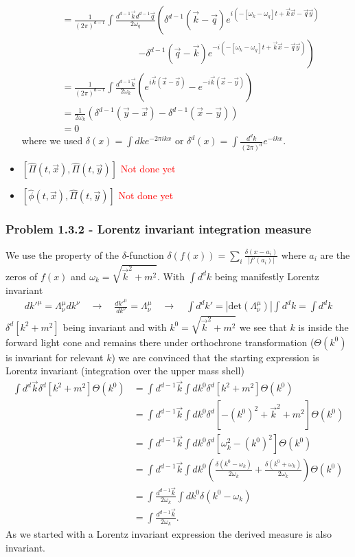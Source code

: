 \documentclass[10pt,a4paper]{article}
\theoremstyle{definition}
\begin{document}
\begin{itemize}
\begin{align}
    &= \frac{1}{(2\pi)^{d-1}}\int \frac{d^{d-1}\vec{k}d^{d-1}\vec{q}}{2 \omega_q}\left(\delta^{d-1}(\vec{k}-\vec{q})e^{i(-[\omega_k-\omega_q]t+\vec{k}\vec{x}-\vec{q}\vec{y})}\right.\\
    &\qquad\qquad\qquad\qquad\left.-\delta^{d-1}(\vec{q}-\vec{k})e^{-i(-[\omega_k-\omega_q]t+\vec{k}\vec{x}-\vec{q}\vec{y})}\right)\\
    &= \frac{1}{(2\pi)^{d-1}}\int \frac{d^{d-1}\vec{k}}{2 \omega_k}\left(e^{i\vec{k}(\vec{x}-\vec{y})}-e^{-i\vec{k}(\vec{x}-\vec{y})}\right)\\
    &= \frac{1}{2 \omega_k}\left( \delta^{d-1}(\vec{y}-\vec{x})-\delta^{d-1}(\vec{x}-\vec{y})\right)\\
    &=0
\end{align}
where we used $\delta(x)=\int dk e^{-2\pi i kx}$ or $\delta^d(x)=\int \frac{d^dk}{(2\pi)^d} e^{-ikx}$.

\item $[\hat\Pi(t,\vec{x}),\hat\Pi(t,\vec{y})]$
\textcolor{red}{Not done yet}
\item $[\hat\phi(t,\vec{x}),\hat\Pi(t,\vec{y})]$
\textcolor{red}{Not done yet}
\end{itemize}

\subsubsection{Problem 1.3.2 - Lorentz invariant integration measure}
We use the property of the $\delta$-function $\delta(f(x))=\sum_i\frac{\delta(x-a_i)}{]f'(a_i)|}$ where ${a_i}$ are the zeros of $f(x)$ and $\omega_k=\sqrt{\vec{k}^2+m^2}$. With $\int d^dk$ being manifestly Lorentz invariant 
\begin{align}
    dk'^\mu = \Lambda^\mu_\nu dk^\nu\quad\rightarrow\quad \frac{dk'^\mu}{dk^\nu}=\Lambda^\mu_\nu\quad\rightarrow\quad\int d^d k'=|\text{det}(\Lambda^\mu_\nu)|\int d^dk=\int d^dk
\end{align}
$\delta^d[k^2+m^2]$ being invariant and with $k^0=\sqrt{\vec{k}^2+m^2}$ we see that $k$ is inside the forward light cone and remains there under orthochrone transformation ($\Theta(k^0)$ is invariant for relevant $k$) we are convinced that the starting expression is Lorentz invariant (integration over the upper mass shell)
\begin{align}
    \int d^{d}\vec{k} \delta^d[k^2+m^2]\Theta(k^0) &=\int d^{d-1}\vec{k}\int dk^0\delta^d[k^2+m^2]\Theta(k^0)\\
    &=\int d^{d-1}\vec{k}\int dk^0\delta^d[-(k^0)^2+\vec{k}^2+m^2]\Theta(k^0)\\
    &=\int d^{d-1}\vec{k}\int dk^0\delta^d[\omega_k^2-(k^0)^2]\Theta(k^0)\\
    &=\int d^{d-1}\vec{k}\int dk^0\left( \frac{\delta(k^0-\omega_k)}{2\omega_k}+\frac{\delta(k^0+\omega_k)}{2\omega_k} \right)\Theta(k^0)\\
    &=\int \frac{d^{d-1}\vec{k}}{2\omega_k}\int dk^0\delta(k^0-\omega_k)\\
    &=\int\frac{d^{d-1}\vec{k}}{2\omega_k}.
\end{align}
As we started with a Lorentz invariant expression the derived measure is also invariant.
\end{document}
